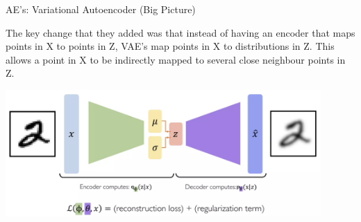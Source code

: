 \documentclass[serif, aspectratio=169]{beamer}
\begin{document}
\begin{frame}{AE’s: Variational Autoencoder (Big Picture)}
    \begin{center}
        \small The key change that they added was that instead of having an encoder that maps points in X to points in Z, VAE’s map points in X to distributions in Z. This allows a point in X to be indirectly mapped to several close neighbour points in Z.

        \includegraphics[width=0.9\textwidth]{pic/VAE big picture.png}

    \end{center}
  
    
\end{frame}
\end{document}
